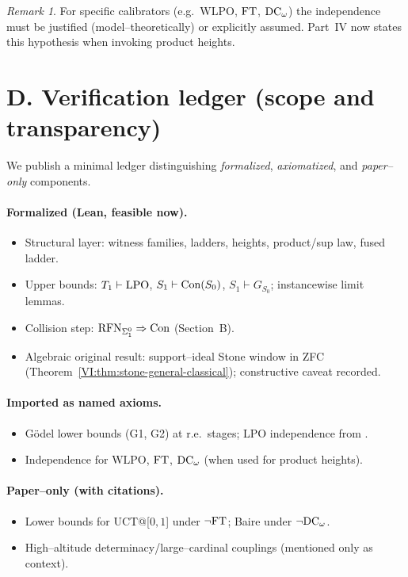 \documentclass[11pt]{article}
\theoremstyle{definition}
\theoremstyle{remark}
\newtheorem{remark}[theorem]{Remark}
\newcommand{\WLPO}{\mathrm{WLPO}}
\begin{document}
\begin{remark}
For specific calibrators (e.g.\ $\WLPO$, $\mathrm{FT}$, $\mathrm{DC}_\omega$) the independence must be justified (model–theoretically) or explicitly assumed. Part~IV now states this hypothesis when invoking product heights.
\end{remark}

\section{D. Verification ledger (scope and transparency)}

We publish a minimal ledger distinguishing \emph{formalized}, \emph{axiomatized}, and \emph{paper–only} components.

\paragraph{Formalized (Lean, feasible now).}
\begin{itemize}
\item Structural layer: witness families, ladders, heights, product/sup law, fused ladder.
\item Upper bounds: $T_1\vdash\mathrm{LPO}$, $S_1\vdash\mathrm{Con}(S_0)$, $S_1\vdash G_{S_0}$; instancewise limit lemmas.
\item Collision step: \(\mathrm{RFN}_{\Sigma^0_1}\Rightarrow \mathrm{Con}\) (Section~B).
\item Algebraic original result: support–ideal Stone window in ZFC (Theorem~\ref{VI:thm:stone-general-classical}); constructive caveat recorded.
\end{itemize}

\paragraph{Imported as named axioms.}
\begin{itemize}
\item G\"odel lower bounds (G1, G2) at r.e.\ stages; LPO independence from \HA.
\item Independence for $\WLPO$, $\mathrm{FT}$, $\mathrm{DC}_\omega$ (when used for product heights).
\end{itemize}

\paragraph{Paper–only (with citations).}
\begin{itemize}
\item Lower bounds for UCT@[$0,1$] under $\neg\mathrm{FT}$; Baire under $\neg\mathrm{DC}_\omega$.
\item High–altitude determinacy/large–cardinal couplings (mentioned only as context).
\end{itemize}
\end{document}
